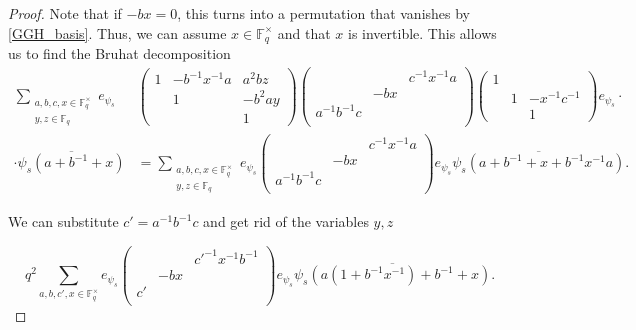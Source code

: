 \documentclass[12pt,reqno]{amsart}
\theoremstyle{definition}
\theoremstyle{remark}
\numberwithin{equation}{section}
\begin{document}
\begin{proof}
    Note that if $-bx = 0$, this turns into a permutation that vanishes by \ref{GGH_basis}. Thus, we can assume $x \in \mathbb{F}_q^\times$ and that $x$ is invertible. This allows us to find the Bruhat decomposition
    \begin{align*}
        \sum_{\substack{a, b, c, x \in \mathbb{F}_q^\times\\y, z \in \mathbb{F}_q}}e_{\psi_s}& \begin{pmatrix}
            1 & -b^{-1}x^{-1}a & a^2 bz\\
            & 1 & -b^2ay\\
            & & 1
        \end{pmatrix} \begin{pmatrix}
            & & c^{-1}x^{-1}a\\
            & -bx & \\
            a^{-1}b^{-1}c & &\\
        \end{pmatrix} \begin{pmatrix}
            1 & &\\
            & 1 & -x^{-1}c^{-1}\\
            & & 1
        \end{pmatrix} e_{\psi_s}\cdot \\ \cdot \overline{\psi_s(a+b^{-1}+x)}&
        =\sum_{\substack{a, b, c, x \in \mathbb{F}_q^\times\\y, z \in \mathbb{F}_q}}e_{\psi_s} \begin{pmatrix}
            & & c^{-1}x^{-1}a\\
            & -bx & \\
            a^{-1}b^{-1}c & &\\
        \end{pmatrix} e_{\psi_s} \overline{\psi_s(a+b^{-1}+x+b^{-1}x^{-1}a)}.
    \end{align*}
    
    We can substitute $c' = a^{-1}b^{-1}c$ and get rid of the variables $y, z$

    \begin{equation*}
        q^2 \sum_{a, b, c', x \in \mathbb{F}_q^\times}e_{\psi_s} \begin{pmatrix}
            & & c'^{-1}x^{-1}b^{-1}\\
            & -bx & \\
            c' & &\\
        \end{pmatrix} e_{\psi_s} \overline{\psi_s(a(1+b^{-1}x^{-1})+b^{-1}+x)}.
    \end{equation*}


\end{proof}
\end{document}
